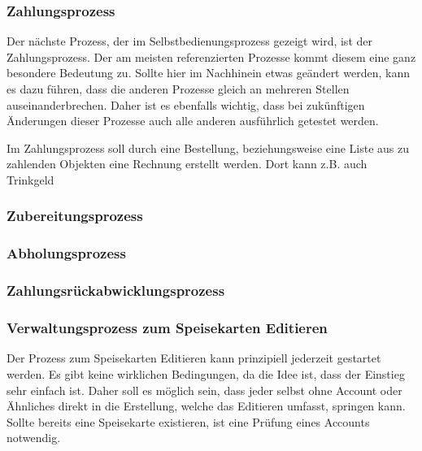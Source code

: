\subsubsection{Zahlungsprozess}
Der nächste Prozess, der im Selbstbedienungsprozess gezeigt wird, ist der Zahlungsprozess. Der am meisten referenzierten Prozesse kommt diesem eine ganz besondere Bedeutung zu. Sollte hier im Nachhinein etwas geändert werden, kann es dazu führen, dass die anderen Prozesse gleich an mehreren Stellen auseinanderbrechen. Daher ist es ebenfalls wichtig, dass bei zukünftigen Änderungen dieser Prozesse auch alle anderen ausführlich getestet werden.

Im Zahlungsprozess soll durch eine Bestellung, beziehungsweise eine Liste aus zu zahlenden Objekten eine Rechnung erstellt werden. Dort kann z.B. auch Trinkgeld 

\clearpage
{}



\subsubsection{Zubereitungsprozess}
\clearpage
{}

\subsubsection{Abholungsprozess}
\clearpage
{}

\subsubsection{Zahlungsrückabwicklungsprozess}
\clearpage
{}

\subsubsection{Verwaltungsprozess zum Speisekarten Editieren}
Der Prozess zum Speisekarten Editieren kann prinzipiell jederzeit gestartet werden. Es gibt keine wirklichen Bedingungen, da die Idee ist, dass der Einstieg sehr einfach ist. Daher soll es möglich sein, dass jeder selbst ohne Account oder Ähnliches direkt in die Erstellung, welche das Editieren umfasst, springen kann. Sollte bereits eine Speisekarte existieren, ist eine Prüfung eines Accounts notwendig.

